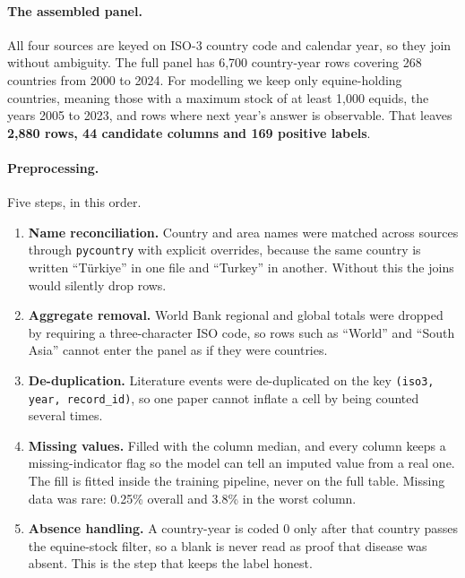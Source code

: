 \documentclass[10pt]{article}
\begin{document}
\paragraph{The assembled panel.} All four sources are keyed on ISO-3 country code and
calendar year, so they join without ambiguity. The full panel has 6,700 country-year
rows covering 268 countries from 2000 to 2024. For modelling we keep only
equine-holding countries, meaning those with a maximum stock of at least 1{,}000 equids, the
years 2005 to 2023, and rows where next year's answer is observable. That leaves
\textbf{2,880 rows, 44 candidate columns and 169 positive labels}.

\paragraph{Preprocessing.} Five steps, in this order.

\begin{enumerate}
\setlength{\itemsep}{0.1em}
\item \textbf{Name reconciliation.} Country and area names were matched across sources
      through \texttt{pycountry} with explicit overrides, because the same country is
      written ``T\"urkiye'' in one file and ``Turkey'' in another. Without this the joins
      would silently drop rows.
\item \textbf{Aggregate removal.} World Bank regional and global totals were dropped by
      requiring a three-character ISO code, so rows such as ``World'' and ``South Asia''
      cannot enter the panel as if they were countries.
\item \textbf{De-duplication.} Literature events were de-duplicated on the key
      \texttt{(iso3, year, record\_id)}, so one paper cannot inflate a cell by being
      counted several times.
\item \textbf{Missing values.} Filled with the column median, and every column keeps a
      missing-indicator flag so the model can tell an imputed value from a real one. The
      fill is fitted inside the training pipeline, never on the full table. Missing data
      was rare: 0.25\% overall and 3.8\% in the worst column.
\item \textbf{Absence handling.} A country-year is coded 0 only after that country passes
      the equine-stock filter, so a blank is never read as proof that disease was absent.
      This is the step that keeps the label honest.
\end{enumerate}
\end{document}
